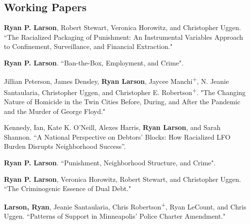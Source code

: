 \documentclass[letterpaper]{article}
\newenvironment{publist}{%
  \begin{list}{}{%
    \setlength{\leftmargin}{0cm}   %
    \setlength{\labelwidth}{2cm}     %
    \setlength{\labelsep}{0.5cm}     %
  }%
}{%
  \end{list}%
}
\begin{document}
\subsection*{Working Papers}
\begin{publist}

\item \textbf{Ryan P. Larson}, Robert Stewart, Veronica Horowitz, and Christopher Uggen. ``The Racialized Packaging of Punishment: An Instrumental Variables Approach to Confinement, Surveillance, and Financial Extraction."

\item \textbf{Ryan P. Larson}. ``Ban-the-Box, Employment, and Crime". 

\item Jillian Peterson, James Densley, \textbf{Ryan Larson}, Jaycee Manchi\textsuperscript{+}, N. Jeanie Santaularia, Christopher Uggen, and Christopher E. Robertson\textsuperscript{+}. "The Changing Nature of Homicide in the Twin Cities Before, During, and After the Pandemic and the Murder of George Floyd."

\item Kennedy, Ian, Kate K. O’Neill, Alexes Harris, \textbf{Ryan Larson}, and Sarah Shannon. “A National Perspective on Debtors’ Blocks: How Racialized LFO Burden Disrupts Neighborhood Success”.

\item \textbf{Ryan P. Larson}. ``Punishment, Neighborhood Structure, and Crime".


\item \textbf{Ryan P. Larson}, Veronica Horowitz, Robert Stewart, and Christopher Uggen. ``The Criminogenic Essence of Dual Debt."

\item \textbf{Larson, Ryan}, Jeanie Santaularia, Chris Robertson\textsuperscript{+}, Ryan LeCount, and Chris Uggen.  ``Patterns of Support in Minneapolis’ Police Charter Amendment." 



\end{publist}
\end{document}
